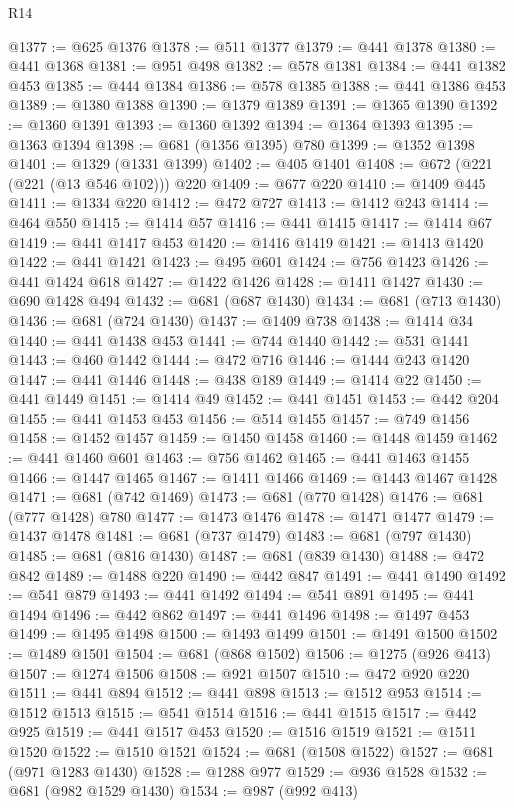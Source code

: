 \begin{lexlean}{R14}
\begin{coremodule}
@1377 := @625 @1376
@1378 := @511 @1377
@1379 := @441 @1378
@1380 := @441 @1368
@1381 := @951 @498
@1382 := @578 @1381
@1384 := @441 @1382 @453
@1385 := @444 @1384
@1386 := @578 @1385
@1388 := @441 @1386 @453
@1389 := @1380 @1388
@1390 := @1379 @1389
@1391 := @1365 @1390
@1392 := @1360 @1391
@1393 := @1360 @1392
@1394 := @1364 @1393
@1395 := @1363 @1394
@1398 := @681 (@1356 @1395) @780
@1399 := @1352 @1398
@1401 := @1329 (@1331 @1399)
@1402 := @405 @1401
@1408 := @672 (@221 (@221 (@13 @546 @102))) @220
@1409 := @677 @220
@1410 := @1409 @445
@1411 := @1334 @220
@1412 := @472 @727
@1413 := @1412 @243
@1414 := @464 @550
@1415 := @1414 @57
@1416 := @441 @1415
@1417 := @1414 @67
@1419 := @441 @1417 @453
@1420 := @1416 @1419
@1421 := @1413 @1420
@1422 := @441 @1421
@1423 := @495 @601
@1424 := @756 @1423
@1426 := @441 @1424 @618
@1427 := @1422 @1426
@1428 := @1411 @1427
@1430 := @690 @1428 @494
@1432 := @681 (@687 @1430)
@1434 := @681 (@713 @1430)
@1436 := @681 (@724 @1430)
@1437 := @1409 @738
@1438 := @1414 @34
@1440 := @441 @1438 @453
@1441 := @744 @1440
@1442 := @531 @1441
@1443 := @460 @1442
@1444 := @472 @716
@1446 := @1444 @243 @1420
@1447 := @441 @1446
@1448 := @438 @189
@1449 := @1414 @22
@1450 := @441 @1449
@1451 := @1414 @49
@1452 := @441 @1451
@1453 := @442 @204
@1455 := @441 @1453 @453
@1456 := @514 @1455
@1457 := @749 @1456
@1458 := @1452 @1457
@1459 := @1450 @1458
@1460 := @1448 @1459
@1462 := @441 @1460 @601
@1463 := @756 @1462
@1465 := @441 @1463 @1455
@1466 := @1447 @1465
@1467 := @1411 @1466
@1469 := @1443 @1467 @1428
@1471 := @681 (@742 @1469)
@1473 := @681 (@770 @1428)
@1476 := @681 (@777 @1428) @780
@1477 := @1473 @1476
@1478 := @1471 @1477
@1479 := @1437 @1478
@1481 := @681 (@737 @1479)
@1483 := @681 (@797 @1430)
@1485 := @681 (@816 @1430)
@1487 := @681 (@839 @1430)
@1488 := @472 @842
@1489 := @1488 @220
@1490 := @442 @847
@1491 := @441 @1490
@1492 := @541 @879
@1493 := @441 @1492
@1494 := @541 @891
@1495 := @441 @1494
@1496 := @442 @862
@1497 := @441 @1496
@1498 := @1497 @453
@1499 := @1495 @1498
@1500 := @1493 @1499
@1501 := @1491 @1500
@1502 := @1489 @1501
@1504 := @681 (@868 @1502)
@1506 := @1275 (@926 @413)
@1507 := @1274 @1506
@1508 := @921 @1507
@1510 := @472 @920 @220
@1511 := @441 @894
@1512 := @441 @898
@1513 := @1512 @953
@1514 := @1512 @1513
@1515 := @541 @1514
@1516 := @441 @1515
@1517 := @442 @925
@1519 := @441 @1517 @453
@1520 := @1516 @1519
@1521 := @1511 @1520
@1522 := @1510 @1521
@1524 := @681 (@1508 @1522)
@1527 := @681 (@971 @1283 @1430)
@1528 := @1288 @977
@1529 := @936 @1528
@1532 := @681 (@982 @1529 @1430)
@1534 := @987 (@992 @413)

\end{coremodule}
\end{lexlean}
